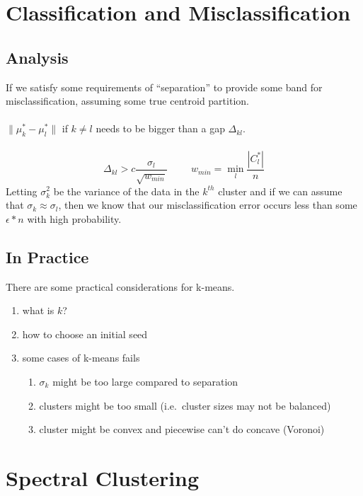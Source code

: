 \documentclass[12pt]{article}
\theoremstyle{plain}
\begin{document}
\section{Classification and Misclassification}
\label{sec:classmisclass}

\subsection{Analysis}
\label{subsec:analysis}

If we satisfy some requirements of ``separation'' to provide some band for misclassification, assuming some true centroid partition.
\\ \\
$ \| \mu^{*}_{k} - \mu^{*}_{l} \| $ if $ k \neq l $ needs to be bigger than a gap $ \Delta_{kl} $.
\\ \\
\[
\Delta_{kl} > c \frac{\sigma_l}{\sqrt{w_{min}}} \hspace{1cm} w_{min} = \min_{l} \frac{|C_l^{*}|}{n}
\]
Letting $ \sigma_k^2 $ be the variance of the data in the $ k^{th} $ cluster and if we can assume that $ \sigma_k \approx \sigma_l $, then we know that our misclassification error occurs less than some $ \epsilon * n $ with high probability.

\subsection{In Practice}
\label{subsec:inpractice}

There are some practical considerations for k-means.
\begin{enumerate}
  \item what is $ k $?
  \item how to choose an initial seed
  \item some cases of k-means fails
  \begin{enumerate}
    \item $ \sigma_k $ might be too large compared to separation
    \item clusters might be too small (i.e.\ cluster sizes may not be balanced)
    \item cluster might be convex and piecewise can't do concave (Voronoi)
  \end{enumerate}
\end{enumerate}

\section{Spectral Clustering}
\label{sec:spectral}
\end{document}
